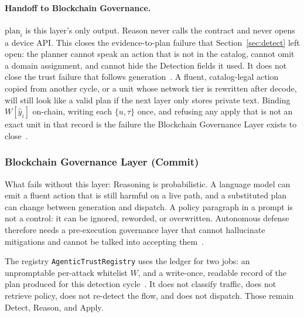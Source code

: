 \documentclass[10pt, conference]{IEEEtran}
\begin{document}
\paragraph{Handoff to Blockchain Governance.}
$\mathrm{plan}_i$ is this layer's only output. Reason never calls the contract and never opens a device API. This closes the evidence-to-plan failure that Section~\ref{sec:detect} left open: the planner cannot speak an action that is not in the catalog, cannot omit a domain assignment, and cannot hide the Detection fields it used. It does not close the trust failure that follows generation~\cite{chhabra2026,pendli2025}. A fluent, catalog-legal action copied from another cycle, or a unit whose network tier is rewritten after decode, will still look like a valid plan if the next layer only stores private text. Binding $W[\hat{y}_i]$ on-chain, writing each $\{u,\tau\}$ once, and refusing any apply that is not an exact unit in that record is the failure the Blockchain Governance Layer exists to close~\cite{zhang2024exploit,jan2025}.

\subsubsection{Blockchain Governance Layer (Commit)}
\label{sec:commit}

What fails without this layer: Reasoning is probabilistic. A language model can emit a fluent action that is still harmful on a live path, and a substituted plan can change between generation and dispatch. A policy paragraph in a prompt is not a control: it can be ignored, reworded, or overwritten. Autonomous defense therefore needs a pre-execution governance layer that cannot hallucinate mitigations and cannot be talked into accepting them~\cite{karim2025,pendli2025,lazer2026,chhabra2026}.

The registry \texttt{AgenticTrustRegistry} uses the ledger for two jobs: an unpromptable per-attack whitelist $W$, and a write-once, readable record of the plan produced for this detection cycle~\cite{jan2025,zhang2024exploit}. It does not classify traffic, does not retrieve policy, does not re-detect the flow, and does not dispatch. Those remain Detect, Reason, and Apply.
\end{document}
